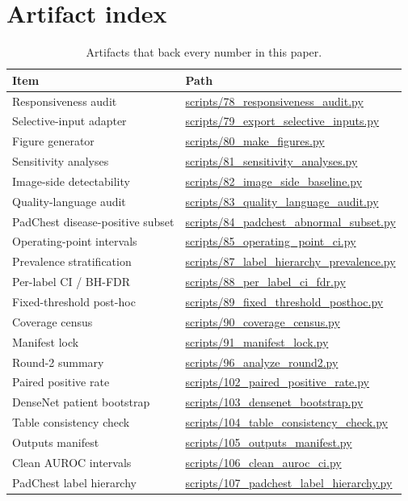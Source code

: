 \section{Artifact index}
\label{app:artifacts}

\begin{table}[H]
\centering
\scriptsize
\caption{Artifacts that back every number in this paper.}
\label{tab:artifacts}
\begin{tabular}{ll}
\toprule
Item & Path \\
\midrule
Responsiveness audit & \url{scripts/78_responsiveness_audit.py} \\
Selective-input adapter & \url{scripts/79_export_selective_inputs.py} \\
Figure generator & \url{scripts/80_make_figures.py} \\
Sensitivity analyses & \url{scripts/81_sensitivity_analyses.py} \\
Image-side detectability & \url{scripts/82_image_side_baseline.py} \\
Quality-language audit & \url{scripts/83_quality_language_audit.py} \\
PadChest disease-positive subset & \url{scripts/84_padchest_abnormal_subset.py} \\
Operating-point intervals & \url{scripts/85_operating_point_ci.py} \\
Prevalence stratification & \url{scripts/87_label_hierarchy_prevalence.py} \\
Per-label CI / BH-FDR & \url{scripts/88_per_label_ci_fdr.py} \\
Fixed-threshold post-hoc & \url{scripts/89_fixed_threshold_posthoc.py} \\
Coverage census & \url{scripts/90_coverage_census.py} \\
Manifest lock & \url{scripts/91_manifest_lock.py} \\
Round-2 summary & \url{scripts/96_analyze_round2.py} \\
Paired positive rate & \url{scripts/102_paired_positive_rate.py} \\
DenseNet patient bootstrap & \url{scripts/103_densenet_bootstrap.py} \\
Table consistency check & \url{scripts/104_table_consistency_check.py} \\
Outputs manifest & \url{scripts/105_outputs_manifest.py} \\
Clean AUROC intervals & \url{scripts/106_clean_auroc_ci.py} \\
PadChest label hierarchy & \url{scripts/107_padchest_label_hierarchy.py} \\

\end{tabular}
\end{table}
